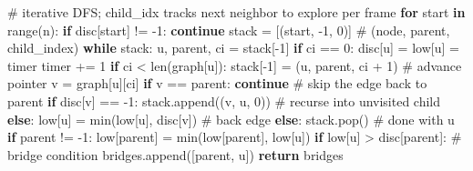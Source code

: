 \documentclass[11pt]{article}
\newenvironment{Shaded}{\begin{snugshade}}{\end{snugshade}}
\newcommand{\BuiltInTok}[1]{\textcolor[rgb]{0.50,0.55,0.55}{#1}}
\newcommand{\CommentTok}[1]{\textcolor[rgb]{0.48,0.49,0.49}{#1}}
\newcommand{\ControlFlowTok}[1]{\textcolor[rgb]{0.99,0.74,0.29}{\textbf{#1}}}
\newcommand{\DecValTok}[1]{\textcolor[rgb]{0.96,0.45,0.00}{#1}}
\newcommand{\KeywordTok}[1]{\textcolor[rgb]{0.81,0.81,0.76}{\textbf{#1}}}
\newcommand{\NormalTok}[1]{\textcolor[rgb]{0.81,0.81,0.76}{#1}}
\newcommand{\OperatorTok}[1]{\textcolor[rgb]{0.81,0.81,0.76}{#1}}
\begin{document}
\begin{Shaded}
\begin{Highlighting}[]
    \CommentTok{\# iterative DFS; child\_idx tracks next neighbor to explore per frame}
    \ControlFlowTok{for}\NormalTok{ start }\KeywordTok{in} \BuiltInTok{range}\NormalTok{(n):}
        \ControlFlowTok{if}\NormalTok{ disc[start] }\OperatorTok{!=} \OperatorTok{{-}}\DecValTok{1}\NormalTok{:}
            \ControlFlowTok{continue}
\NormalTok{        stack }\OperatorTok{=}\NormalTok{ [(start, }\OperatorTok{{-}}\DecValTok{1}\NormalTok{, }\DecValTok{0}\NormalTok{)]  }\CommentTok{\# (node, parent, child\_index)}
        \ControlFlowTok{while}\NormalTok{ stack:}
\NormalTok{            u, parent, ci }\OperatorTok{=}\NormalTok{ stack[}\OperatorTok{{-}}\DecValTok{1}\NormalTok{]}
            \ControlFlowTok{if}\NormalTok{ ci }\OperatorTok{==} \DecValTok{0}\NormalTok{:}
\NormalTok{                disc[u] }\OperatorTok{=}\NormalTok{ low[u] }\OperatorTok{=}\NormalTok{ timer}
\NormalTok{                timer }\OperatorTok{+=} \DecValTok{1}
            \ControlFlowTok{if}\NormalTok{ ci }\OperatorTok{\textless{}} \BuiltInTok{len}\NormalTok{(graph[u]):}
\NormalTok{                stack[}\OperatorTok{{-}}\DecValTok{1}\NormalTok{] }\OperatorTok{=}\NormalTok{ (u, parent, ci }\OperatorTok{+} \DecValTok{1}\NormalTok{)  }\CommentTok{\# advance pointer}
\NormalTok{                v }\OperatorTok{=}\NormalTok{ graph[u][ci]}
                \ControlFlowTok{if}\NormalTok{ v }\OperatorTok{==}\NormalTok{ parent:}
                    \ControlFlowTok{continue}                     \CommentTok{\# skip the edge back to parent}
                \ControlFlowTok{if}\NormalTok{ disc[v] }\OperatorTok{==} \OperatorTok{{-}}\DecValTok{1}\NormalTok{:}
\NormalTok{                    stack.append((v, u, }\DecValTok{0}\NormalTok{))      }\CommentTok{\# recurse into unvisited child}
                \ControlFlowTok{else}\NormalTok{:}
\NormalTok{                    low[u] }\OperatorTok{=} \BuiltInTok{min}\NormalTok{(low[u], disc[v])  }\CommentTok{\# back edge}
            \ControlFlowTok{else}\NormalTok{:}
\NormalTok{                stack.pop()                      }\CommentTok{\# done with u}
                \ControlFlowTok{if}\NormalTok{ parent }\OperatorTok{!=} \OperatorTok{{-}}\DecValTok{1}\NormalTok{:}
\NormalTok{                    low[parent] }\OperatorTok{=} \BuiltInTok{min}\NormalTok{(low[parent], low[u])}
                    \ControlFlowTok{if}\NormalTok{ low[u] }\OperatorTok{\textgreater{}}\NormalTok{ disc[parent]:    }\CommentTok{\# bridge condition}
\NormalTok{                        bridges.append([parent, u])}
    \ControlFlowTok{return}\NormalTok{ bridges}
\end{Highlighting}
\end{Shaded}
\end{document}
